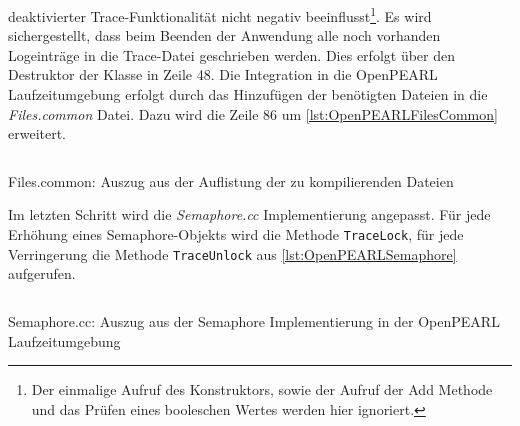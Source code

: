deaktivierter Trace-Funktionalität nicht negativ beeinflusst\footnote{Der
einmalige Aufruf des Konstruktors, sowie der Aufruf der Add Methode und das
Prüfen eines booleschen Wertes werden hier ignoriert.}. Es wird sichergestellt,
dass beim Beenden der Anwendung alle noch vorhanden Logeinträge in die
Trace-Datei geschrieben werden. Dies erfolgt über den Destruktor der Klasse in
Zeile 48. Die Integration in die OpenPEARL Laufzeitumgebung erfolgt durch das
Hinzufügen der benötigten Dateien in die \textit{Files.common} Datei. Dazu wird
die Zeile 86 um \cref{lst:OpenPEARLFilesCommon} erweitert.
\begin{listing}[ht]
  \inputminted[frame=lines,linenos,firstline=86,lastline=88]{bash}{./OpenPEARL/Files.common}
  \caption{Files.common: Auszug aus der Auflistung der zu kompilierenden Dateien}
  \label{lst:OpenPEARLFilesCommon}
\end{listing}
Im letzten Schritt wird die \textit{Semaphore.cc} Implementierung angepasst. Für
jede Erhöhung eines Semaphore-Objekts wird die Methode \texttt{TraceLock}, für
jede Verringerung die Methode \texttt{TraceUnlock} aus
\cref{lst:OpenPEARLSemaphore} aufgerufen.
\begin{listing}[ht]
  \inputminted[frame=lines,linenos,firstline=93,lastline=111]{cpp}{./OpenPEARL/Semaphore.cc}
  \caption{Semaphore.cc: Auszug aus der Semaphore Implementierung in der OpenPEARL Laufzeitumgebung}
  \label{lst:OpenPEARLSemaphore}
\end{listing}

